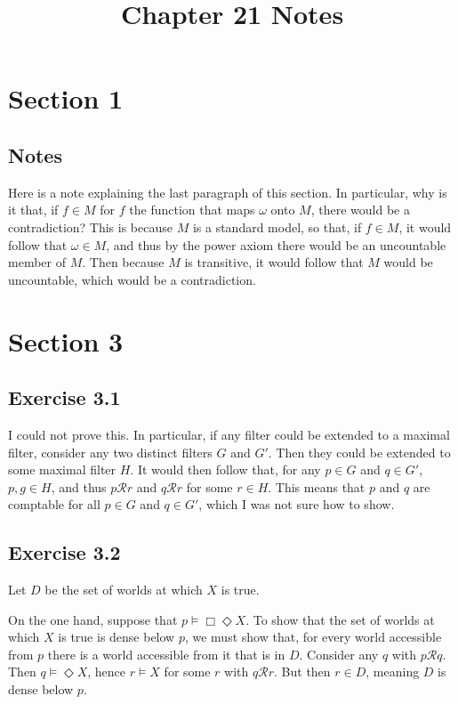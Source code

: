 \documentclass{article}
\title{Chapter 21 Notes}
\date{}
\theoremstyle{definition}
\begin{document}
\maketitle

\section*{Section 1}

\subsection*{Notes}
Here is a note explaining the last paragraph of this section. In particular, why is it that, if 
$f\in M$ for $f$ the function that maps $\omega$ onto $M$, there would be a contradiction? This is because 
$M$ is a standard model, so that, if $f\in M$, it would follow that $\omega\in M$, and thus by 
the power axiom there would be an uncountable member of $M$. Then because $M$ is transitive, it would follow 
that $M$ would be uncountable, which would be a contradiction.

\section*{Section 3}

\subsection*{Exercise 3.1}
I could not prove this. In particular, if any filter could be extended to a maximal filter, consider any two distinct 
filters $G$ and $G'$. Then they could be extended to some maximal filter $H$. It would then follow that, for any 
$p\in G$ and $q\in G'$, $p,g\in H$, and thus $p\mathcal{R}r$ and $q\mathcal{R}r$ for some $r\in H$. This means that 
$p$ and $q$ are comptable for all $p\in G$ and $q\in G'$, which I was not sure how to show.

\subsection*{Exercise 3.2}
Let $D$ be the set of worlds at which $X$ is true.


On the one hand, suppose that $p\vDash\Box\Diamond X$. To show that the set of worlds at which $X$ is true is 
dense below $p$, we must show that, for every world accessible from $p$ there is a world accessible from 
it that is in $D$. Consider any $q$ with $p\mathcal{R}q$. Then $q\vDash\Diamond X$, hence 
$r\vDash X$ for some $r$ with $q\mathcal{R}r$. But then $r\in D$, meaning $D$ is dense below $p$.
\end{document}
